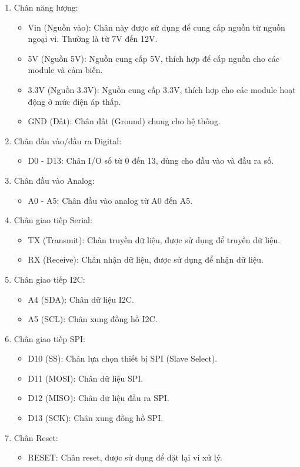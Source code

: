 \begin{enumerate}[-]
    \item Chân năng lượng:
    \begin{itemize}
        \item Vin (Nguồn vào): Chân này được sử dụng để cung cấp nguồn từ nguồn ngoại vi. Thường là từ 7V đến 12V.
        \item 5V (Nguồn 5V): Nguồn cung cấp 5V, thích hợp để cấp nguồn cho các module và cảm biến.
        \item 3.3V (Nguồn 3.3V): Nguồn cung cấp 3.3V, thích hợp cho các module hoạt động ở mức điện áp thấp.
        \item GND (Đất): Chân đất (Ground) chung cho hệ thống.
    \end{itemize}
    \item  Chân đầu vào/đầu ra Digital:
    \begin{itemize}
        \item D0 - D13: Chân I/O số từ 0 đến 13, dùng cho đầu vào và đầu ra số.
    \end{itemize}
    \item  Chân đầu vào Analog:
    \begin{itemize}
        \item A0 - A5: Chân đầu vào analog từ A0 đến A5.
    \end{itemize}
    \item  Chân giao tiếp Serial:
    \begin{itemize}
        \item TX (Transmit): Chân truyền dữ liệu, được sử dụng để truyền dữ liệu.
        \item RX (Receive): Chân nhận dữ liệu, được sử dụng để nhận dữ liệu.
    \end{itemize}
    \item  Chân giao tiếp I2C:
    \begin{itemize}
        \item A4 (SDA): Chân dữ liệu I2C.
        \item A5 (SCL): Chân xung đồng hồ I2C.
    \end{itemize}
    \item  Chân giao tiếp SPI:
    \begin{itemize}
        \item D10 (SS): Chân lựa chọn thiết bị SPI (Slave Select).
        \item D11 (MOSI): Chân dữ liệu SPI.
        \item D12 (MISO): Chân dữ liệu đầu ra SPI.
        \item D13 (SCK): Chân xung đồng hồ SPI.
    \end{itemize}
    \item  Chân Reset:
    \begin{itemize}
        \item RESET: Chân reset, được sử dụng để đặt lại vi xử lý.
    \end{itemize}
\end{enumerate}


